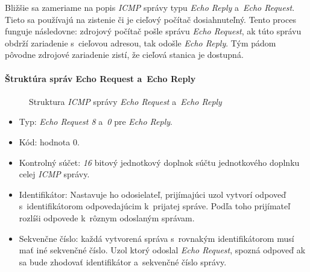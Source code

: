 \documentclass[12pt,a4paper,titlepage]{article}
\begin{document}
        Bližšie sa zameriame na popis \emph{ICMP} správy typu \emph{Echo Reply}
        a~\emph{Echo Request}. Tieto sa používajú na zistenie či je cieľový počítač dosiahnuteľný.
        Tento proces funguje následovne: zdrojový počítač pošle správu \emph{Echo Request}, ak túto
        správu obdrží zariadenie s~cieľovou adresou, tak odošle \emph{Echo Reply}. Tým pádom pôvodne
        zdrojové zariadenie zistí, že cieľová stanica je dostupná.

    \paragraph{Štruktúra správ Echo Request a~Echo Reply}
    \begin{figure}[h!]
        \begin{center}
            \caption{Struktura \emph{ICMP} správy \emph{Echo Request} a~\emph{Echo Reply}}
            \label{icmp_echo}
        \end{center}
    \end{figure}

    \begin{itemize}
        \item Typ: \emph{Echo Request 8} a~\emph{0} pre \emph{Echo Reply}.
        \item Kód: hodnota 0.
        \item Kontrolný súčet: \emph{16} bitový jednotkový doplnok súčtu jednotkového 
            doplnku celej \emph{ICMP} správy.
        \item Identifikátor: Nastavuje ho odosielateľ, prijímajúci uzol vytvorí odpoveď 
            s~identifikátorom odpovedajúcim k~prijatej správe. Podľa toho prijímateľ 
            rozlíši odpovede k~rôznym odoslaným správam.
        \item Sekvenčne číslo: každá vytvorená správa s~rovnakým identifikátorom musí
            mať iné sekvenčné číslo. Uzol ktorý odoslal \emph{Echo Request}, spozná odpoveď 
            ak sa bude zhodovať identifikátor a~sekvenčné číslo správy.
    \end{itemize}
\end{document}
